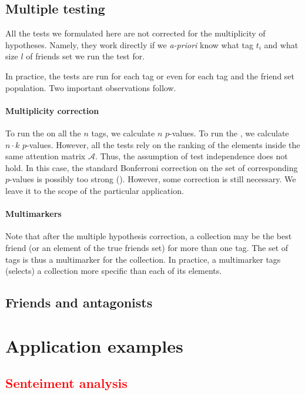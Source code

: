 \documentclass{llncs}
\newcommand{\red}[1]{\textcolor{red}{#1}}
\begin{document}
\subsection{Multiple testing}
\label{sec:multimurkers}

All the tests we formulated here are not corrected for the multiplicity of hypotheses. Namely, they work directly if we \textit{a-priori} know what tag $t_i$ and what size $l$ of friends set we run the test for. 

In practice, the tests are run for each tag or even for each tag and the friend set population. Two important observations follow.

\paragraph*{Multiplicity correction} 
To run the  on all the $n$ tags, we 
calculate $n$ $p$-values. To run the , we calculate $n \cdot k$ $p$-values. However, all the tests rely on the ranking of the elements inside the same attention matrix $\mathcal{A}$. Thus, the assumption of test independence does not hold. In this case, the standard Bonferroni correction on the set of corresponding $p$-values is possibly too strong (\cite{cabin2000bonferroni}). However, some correction is still necessary. We leave it to the scope of the particular application.

\paragraph*{Multimarkers} Note that after the multiple hypothesis correction, a collection may be the best friend (or an element of the true friends set) for more than one tag. The set of tags is thus a multimarker for the collection. In practice, a multimarker tags (selects) a collection more specific than each of its elements.

\subsection{Friends and antagonists}





\section{Application examples}
\subsection{\red{Senteiment analysis}}
\end{document}
